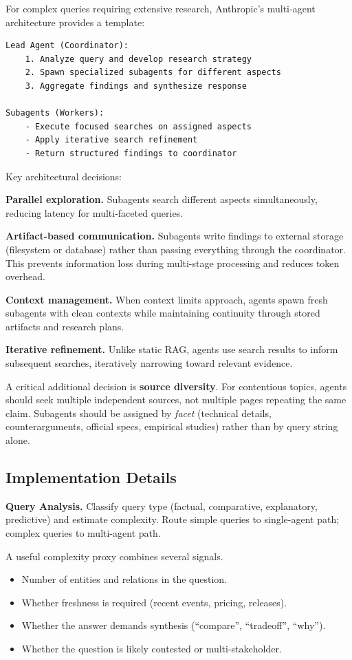 For complex queries requiring extensive research, Anthropic's multi-agent architecture \cite{anthropicresearch2025} provides a template:

\begin{verbatim}
Lead Agent (Coordinator):
    1. Analyze query and develop research strategy
    2. Spawn specialized subagents for different aspects
    3. Aggregate findings and synthesize response

Subagents (Workers):
    - Execute focused searches on assigned aspects
    - Apply iterative search refinement
    - Return structured findings to coordinator
\end{verbatim}

Key architectural decisions:

\textbf{Parallel exploration.} Subagents search different aspects simultaneously, reducing latency for multi-faceted queries.

\textbf{Artifact-based communication.} Subagents write findings to external storage (filesystem or database) rather than passing everything through the coordinator. This prevents information loss during multi-stage processing and reduces token overhead.

\textbf{Context management.} When context limits approach, agents spawn fresh subagents with clean contexts while maintaining continuity through stored artifacts and research plans.

\textbf{Iterative refinement.} Unlike static RAG, agents use search results to inform subsequent searches, iteratively narrowing toward relevant evidence.

A critical additional decision is \textbf{source diversity}. For contentious topics, agents should seek multiple independent sources, not multiple pages repeating the same claim. Subagents should be assigned by \textit{facet} (technical details, counterarguments, official specs, empirical studies) rather than by query string alone.

\subsection{Implementation Details}

\textbf{Query Analysis.} Classify query type (factual, comparative, explanatory, predictive) and estimate complexity. Route simple queries to single-agent path; complex queries to multi-agent path.

A useful complexity proxy combines several signals.
\begin{itemize}
\item Number of entities and relations in the question.
\item Whether freshness is required (recent events, pricing, releases).
\item Whether the answer demands synthesis (``compare'', ``tradeoff'', ``why'').
\item Whether the question is likely contested or multi-stakeholder.
\end{itemize}

